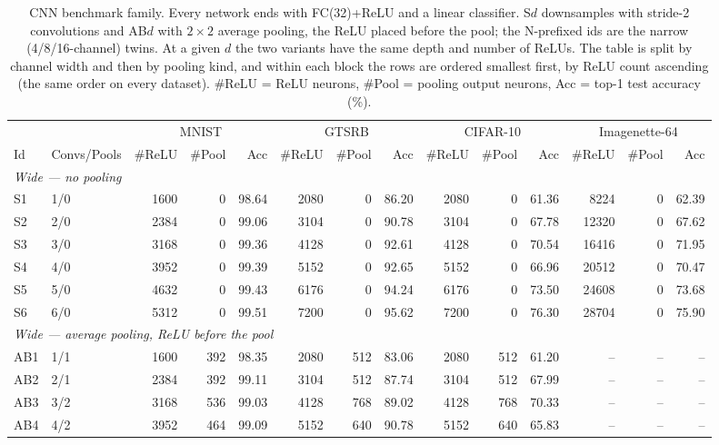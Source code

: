 \begin{table}[t]
\centering
\small
\caption{CNN benchmark family. Every network ends with FC(32)+ReLU and a linear classifier. S$d$ downsamples with stride-2 convolutions and AB$d$ with $2{\times}2$ average pooling, the ReLU placed before the pool; the N-prefixed ids are the narrow (4/8/16-channel) twins. At a given $d$ the two variants have the same depth and number of ReLUs. The table is split by channel width and then by pooling kind, and within each block the rows are ordered smallest first, by ReLU count ascending (the same order on every dataset). \#ReLU = ReLU neurons, \#Pool = pooling output neurons, Acc = top-1 test accuracy (\%).}
\label{tab:cnn-bench}
\begin{tabular}{llrrrrrrrrrrrr}
\toprule
 & & \multicolumn{3}{c}{MNIST} & \multicolumn{3}{c}{GTSRB} & \multicolumn{3}{c}{CIFAR-10} & \multicolumn{3}{c}{Imagenette-64} \\
\cmidrule(lr){3-5} \cmidrule(lr){6-8} \cmidrule(lr){9-11} \cmidrule(lr){12-14}
Id & Convs/Pools & \#ReLU & \#Pool & Acc & \#ReLU & \#Pool & Acc & \#ReLU & \#Pool & Acc & \#ReLU & \#Pool & Acc \\
\midrule
\multicolumn{14}{l}{\textit{Wide --- no pooling}} \\
S1 & 1/0 & 1600 & 0 & 98.64 & 2080 & 0 & 86.20 & 2080 & 0 & 61.36 & 8224 & 0 & 62.39 \\
S2 & 2/0 & 2384 & 0 & 99.06 & 3104 & 0 & 90.78 & 3104 & 0 & 67.78 & 12320 & 0 & 67.62 \\
S3 & 3/0 & 3168 & 0 & 99.36 & 4128 & 0 & 92.61 & 4128 & 0 & 70.54 & 16416 & 0 & 71.95 \\
S4 & 4/0 & 3952 & 0 & 99.39 & 5152 & 0 & 92.65 & 5152 & 0 & 66.96 & 20512 & 0 & 70.47 \\
S5 & 5/0 & 4632 & 0 & 99.43 & 6176 & 0 & 94.24 & 6176 & 0 & 73.50 & 24608 & 0 & 73.68 \\
S6 & 6/0 & 5312 & 0 & 99.51 & 7200 & 0 & 95.62 & 7200 & 0 & 76.30 & 28704 & 0 & 75.90 \\
\midrule
\multicolumn{14}{l}{\textit{Wide --- average pooling, ReLU before the pool}} \\
AB1 & 1/1 & 1600 & 392 & 98.35 & 2080 & 512 & 83.06 & 2080 & 512 & 61.20 & -- & -- & -- \\
AB2 & 2/1 & 2384 & 392 & 99.11 & 3104 & 512 & 87.74 & 3104 & 512 & 67.99 & -- & -- & -- \\
AB3 & 3/2 & 3168 & 536 & 99.03 & 4128 & 768 & 89.02 & 4128 & 768 & 70.33 & -- & -- & -- \\
AB4 & 4/2 & 3952 & 464 & 99.09 & 5152 & 640 & 90.78 & 5152 & 640 & 65.83 & -- & -- & -- \\

\end{tabular}
\end{table}

